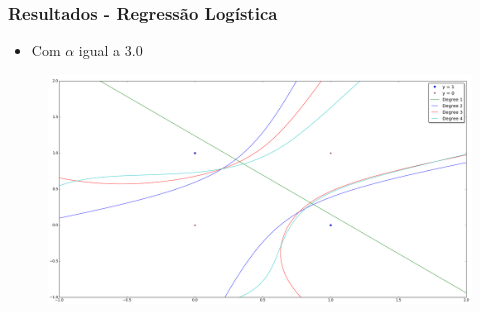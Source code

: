 \documentclass[10pt]{beamer}
\begin{document}
\begin{frame}
  \frametitle{Resultados - Regressão Logística}

  \begin{itemize}
  \item Com $\alpha$ igual a 3.0
 \end{itemize}

  \begin{adjustwidth}{-3em}{-3em}
  \begin{figure}[htb]
    \begin{center}
        \includegraphics[scale=0.18]{img/decision_boundaries.png}
    \end{center}
  \end{figure}
  \end{adjustwidth}
\end{frame}
\end{document}

